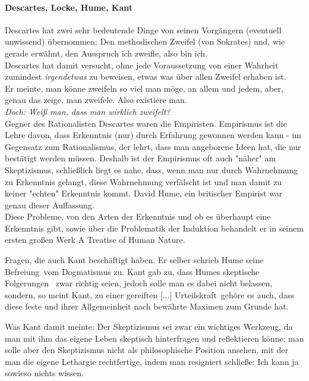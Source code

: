 \documentclass[11pt,a4paper]{article}
\begin{document}
		\paragraph{Descartes, Locke, Hume, Kant}
Descartes hat zwei sehr bedeutende Dinge von seinen Vorgängern (eventuell unwissend) übernommen: Den methodischen Zweifel (von Sokrates) und, wie gerade erwähnt, den Ausspruch \glqq ich zweifle, also bin ich\grqq.\\%
Descartes hat damit versucht, ohne jede Voraussetzung von einer Wahrheit zumindest \emph{irgendetwas} zu \glqq beweisen\grqq, etwas was über allen Zweifel erhaben ist.\\
Er meinte, man könne zweifeln so viel man möge, an allem und jedem, aber, genau das zeige, man zweifele. Also existiere man.\\ %
\emph{Doch: Weiß man, dass man wirklich zweifelt?}\\ %

Gegner des Rationalisten Descartes waren die Empiristen. Empirismus ist die Lehre davon, dass Erkenntnis (nur) durch Erfahrung gewonnen werden kann - im Gegensatz zum Rationalismus, der lehrt, dass man angeborene Ideen hat, die nur bestätigt werden müssen. Deshalb ist der Empirismus oft auch "näher" am Skeptizismus, schließlich liegt es nahe, dass, wenn man nur durch Wahrnehmung zu Erkenntnis gelangt, diese Wahrnehmung verfälscht ist und man damit zu keiner "echten" Erkenntnis kommt. David Hume, ein britischer Empirist war genau dieser Auffassung.\\
Diese Probleme, von den Arten der Erkenntnis und ob es überhaupt eine Erkenntnis gibt, sowie über die Problematik der Induktion behandelt er in seinem ersten großen Werk \glqq A Treatise of Human Nature\grqq.

Fragen, die auch Kant beschäftigt haben. Er selber schrieb Hume seine \glqq Befreiung\grqq\ vom Dogmatismus zu. Kant gab zu, dass Humes skeptische Folgerungen%
\ zwar richtig seien, jedoch solle man es dabei nicht belassen, sondern, so meint Kant, zu einer  \glqq gereiften [...] Urteilskraft\grqq\ gehöre es auch, dass diese \glqq feste und ihrer Allgemeinheit nach bewährte Maximen zum Grunde hat\grqq.%

Was Kant damit meinte: Der Skeptizismus sei zwar ein wichtiges Werkzeug, da man mit ihm das eigene Leben skeptisch hinterfragen und reflektieren könne; man solle aber den Skeptizismus nicht als philosophische Position ansehen, mit der man die eigene Lethargie rechtfertige, indem man resigniert schließe: \glqq Ich kann ja sowieso nichts wissen\grqq .
\end{document}
